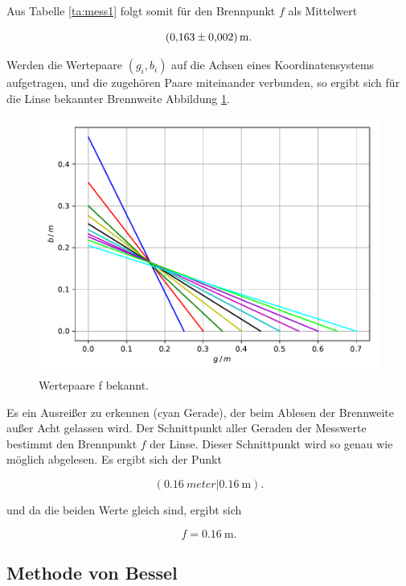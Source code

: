 Aus Tabelle \ref{ta:mess1} folgt somit für den Brennpunkt $f$ als Mittelwert 

\begin{equation*}
\SI{0.163+-0.002}{\meter}.
\end{equation*}

Werden die Wertepaare $(g_i, b_i)$ auf die Achsen eines Koordinatensystems aufgetragen, und 
die zugehören Paare miteinander verbunden, so ergibt sich für die Linse bekannter 
Brennweite Abbildung \ref{fig:plot1}.

\begin{figure}
  \centering
  \includegraphics{content/plot1.pdf}
  \caption{Wertepaare f bekannt.}
  \label{fig:plot1}
\end{figure}

Es ein Ausreißer zu erkennen (cyan Gerade), der beim Ablesen der Brennweite außer Acht gelassen wird. 
Der Schnittpunkt aller Geraden der Messwerte bestimmt den Brennpunkt $f$ der Linse. Dieser
Schnittpunkt wird so genau wie möglich abgelesen. Es ergibt sich der Punkt 

\begin{equation*}
(\SI{0.16}{meter} \vert \SI{0.16}{\meter}).
\end{equation*}

und da die beiden Werte gleich sind, ergibt sich 

\begin{equation*}
f = \SI{0.16}{\meter}.
\end{equation*}

\subsection{Methode von Bessel}

